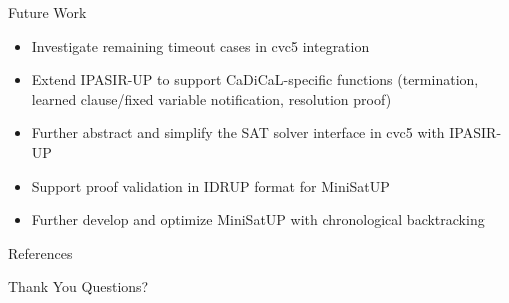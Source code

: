 \documentclass{beamer}
\begin{document}
\begin{frame}{Future Work}
  \begin{itemize}
    \item Investigate remaining timeout cases in cvc5 integration
    \item Extend IPASIR-UP to support CaDiCaL-specific functions (termination, learned clause/fixed variable notification, resolution proof)
    \item Further abstract and simplify the SAT solver interface in cvc5 with IPASIR-UP
    \item Support proof validation in IDRUP format for MiniSatUP
    \item Further develop and optimize MiniSatUP with chronological backtracking
  \end{itemize}
\end{frame}

\begin{frame}[t,allowframebreaks]{References}
  \scriptsize
  \nocite{*}
  
  
\end{frame}

\begin{frame}{Thank You}
  Questions?
\end{frame}
\end{document}
